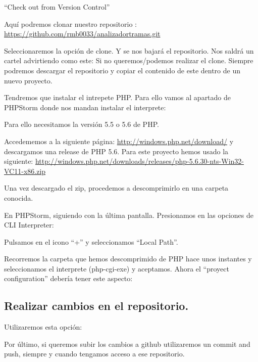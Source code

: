 “Check out from Version Control”


Aquí podremos clonar nuestro repositorio \cite{GITHUB} :
\url{https://github.com/rmb0033/analizadortramas.git}


Seleccionaremos la opción de clone. Y se nos bajará el repositorio.
Nos saldrá un cartel advirtiendo como este:
Si no queremos/podemos realizar el clone. Siempre podremos descargar el repositorio y copiar el contenido de este dentro de un nuevo proyecto.

Tendremos que instalar el intrepete PHP. Para ello vamos al apartado de PHPStorm donde nos mandan instalar el interprete:

Para ello necesitamos la versión 5.5 o 5.6 de PHP.

Accedememos a la siguiente página: 
\url{http://windows.php.net/download/}
y descargamos una release de PHP 5.6. 
Para este proyecto hemos usado la siguiente:
\url{http://windows.php.net/downloads/releases/php-5.6.30-nts-Win32-VC11-x86.zip}

Una vez descargado el zip, procedemos a descomprimirlo en una carpeta conocida.

En PHPStorm, siguiendo con la última pantalla. Presionamos en las opciones de CLI Interpreter:

Pulsamos en el icono “+” y seleccionamos “Local Path”.

Recorremos la carpeta que hemos descomprimido de PHP hace unos instantes y seleccionamos el interprete (php-cgi-exe) y aceptamos.
Ahora el “proyect configuration” debería tener este aspecto:

\subsection{Realizar cambios en el repositorio.}
Utilizaremos esta opción:

Por último, si queremos subir los cambios a github utilizaremos un commit and push, siempre y cuando tengamos acceso a ese repositorio.

